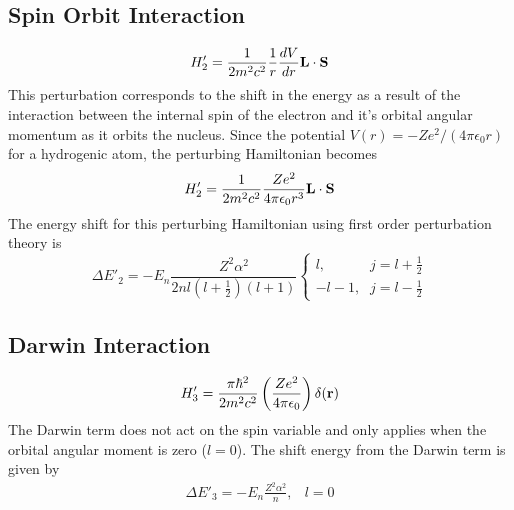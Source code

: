 \documentclass[a4paper]{serif}
\begin{document}
	\subsection{Spin Orbit Interaction}
	\begin{displaymath}
		H'_2 = \frac{1}{2m^2c^2} \frac{1}{r} \frac{dV}{dr} {\bf L} \cdot {\bf S} 
	\end{displaymath}
    This perturbation corresponds to the shift in the energy as a result of the interaction
    between the internal spin of the electron and it's orbital angular momentum as it
    orbits the nucleus. Since the potential $V(r) = -Ze^2/(4 \pi \epsilon_0 r)$ for
    a hydrogenic atom, the perturbing Hamiltonian becomes
    \begin{displaymath}
        H'_2 = \frac{1}{2m^2c^2} \frac{Ze^2}{4\pi \epsilon_0 r^3} {\bf L} \cdot {\bf S}
    \end{displaymath}
    The energy shift for this perturbing Hamiltonian using first order perturbation theory is
    \begin{displaymath}
        \Delta E'_2 = -E_n \frac{Z^2 \alpha^2}{2nl(l + \frac{1}{2})(l + 1)}
        \left\{
            \begin{array}{ll}
                l       \mbox{,} &  j = l + \frac{1}{2} \\
                -l - 1  \mbox{,} &  j = l - \frac{1}{2}
            \end{array}
        \right.
    \end{displaymath}

	\subsection{Darwin Interaction}
	\begin{displaymath}
		H'_3 = \frac{\pi\hbar^2}{2m^2c^2} \left( \frac{Ze^2}{4\pi\epsilon_0} \right) \delta(\bf{r})
	\end{displaymath}
    The Darwin term does not act on the spin variable and only applies when
    the orbital angular moment is zero ($l=0$).
    The shift energy from the Darwin term is given by
    \begin{displaymath}
        \begin{array}{ll}
        \Delta E'_3 = -E_n \frac{Z^2 \alpha^2}{n} , & l = 0
        \end{array}
    \end{displaymath}
\end{document}
